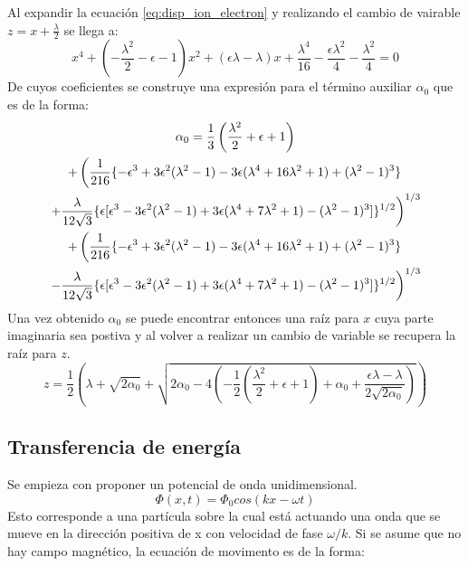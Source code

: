 \documentclass[12pt]{article}
\begin{document}
Al expandir la ecuación \ref{eq:disp_ion_electron} y realizando el cambio de vairable $z=x+\frac{\lambda}{2}$ se llega a:
\begin{equation}
x^4 + (-\frac{\lambda^2}{2} -\epsilon -1)x^2 + (\epsilon \lambda - \lambda)x + \frac{\lambda^4}{16}-\frac{\epsilon \lambda^2}{4}-\frac{\lambda^2}{4}=0
\end{equation}
De cuyos coeficientes se construye una expresión para el término auxiliar $\alpha_0$ que es de la forma:
\begin{multline}
\alpha_0 = \frac{1}{3}\left(\frac{\lambda^2}{2} + \epsilon + 1 \right)\\
+ \left(\frac{1}{216}\lbrace-\epsilon^3+3\epsilon^2(\lambda^2-1)-
3\epsilon(\lambda^4 +16\lambda^2 +1)+ (\lambda^2 -1)^3\rbrace \right. \\
\left. +\frac{\lambda}{12\sqrt{3}}\lbrace\epsilon [\epsilon^3-3\epsilon^2(\lambda^2 -1)+3\epsilon(\lambda^4 + 7\lambda^2 +1)- (\lambda^2-1)^3]\rbrace^{1/2} \vphantom{\frac{1}{216}}\right)^{1/3}\\
+ \left(\frac{1}{216}\lbrace-\epsilon^3+3\epsilon^2(\lambda^2-1)-
3\epsilon(\lambda^4 +16\lambda^2 +1)+ (\lambda^2 -1)^3\rbrace \right. \\
\left. -\frac{\lambda}{12\sqrt{3}}\lbrace\epsilon [\epsilon^3-3\epsilon^2(\lambda^2 -1)+3\epsilon(\lambda^4 + 7\lambda^2 +1)- (\lambda^2-1)^3]\rbrace^{1/2} \vphantom{\frac{1}{216}}\right)^{1/3}
\end{multline}
Una vez obtenido $\alpha_0$ se puede encontrar entonces una raíz para $x$ cuya parte imaginaria sea postiva y al volver a realizar un cambio de variable se recupera la raíz para $z$.
\begin{equation}
z= \frac{1}{2} \left( \lambda + \sqrt{2\alpha_0} + \sqrt{2\alpha_0 -4 \left(-\frac{1}{2}(\frac{\lambda^2}{2}+\epsilon+1)+\alpha_0 +\frac{\epsilon \lambda - \lambda}{2\sqrt{2\alpha_0}}\right)}\right)
\end{equation}
\subsection*{Transferencia de energía}
Se empieza con proponer un potencial de onda unidimensional.
\begin{equation}
\Phi(x,t) = \Phi_0 cos(kx-\omega t)
\end{equation}
Esto corresponde a una partícula sobre la cual está actuando una onda que se mueve en la dirección positiva de x con velocidad de fase $\omega /k$. Si se asume que no hay campo magnético, la ecuación de movimento es de la forma:
\end{document}
